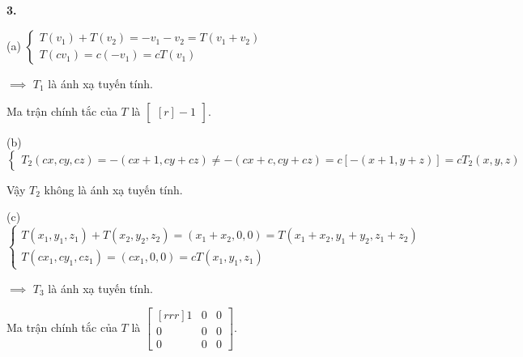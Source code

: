 \documentclass{article}
\begin{document}
    
    \textbf{3.}

    (a) $ \begin{cases}{}
        T(v_1)   + T(v_2) = -v_1 - v_2 = T(v_1 + v_2) \\
        T(cv_1) = c(-v_1) = cT(v_1)
    \end{cases}$

    $\implies$ $T_1$ là ánh xạ tuyến tính.

    Ma trận chính tắc của $T$ là $ \begin{bmatrix}[r]
        -1 
    \end{bmatrix} $.

    (b) $ \begin{cases}{}
        T_2(cx,cy,cz) = -(cx + 1, cy + cz) \ne -(cx + c, cy + cz) = c[-(x+1,y+z)] = cT_2(x,y,z)
    \end{cases}$

    Vậy $T_2$ không là ánh xạ tuyến tính.

    (c) $ \begin{cases}{}
        T(x_1, y_1, z_1) + T(x_2, y_2, z_2) = (x_1 + x_2, 0, 0) = T(x_1 +x_2, y_1+y_2, z_1 + z_2) \\
        T(cx_1, cy_1, cz_1) = (cx_1, 0, 0) = cT(x_1, y_1, z_1)
    \end{cases}$

    $\implies$ $T_3$ là ánh xạ tuyến tính.

    Ma trận chính tắc của $T$ là $ \begin{bmatrix}[rrr]
        1 & 0 & 0 \\
        0 & 0 & 0 \\
        0 & 0 & 0 
    \end{bmatrix} $.
\end{document}
